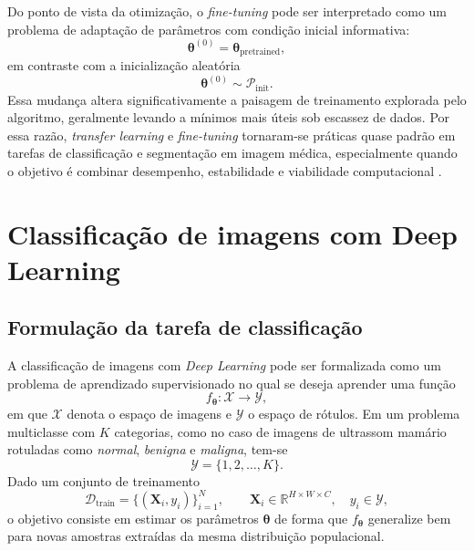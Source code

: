 \documentclass[tcc,capa]{texufpel}
\begin{document}
Do ponto de vista da otimização, o \textit{fine-tuning} pode ser interpretado como um problema de adaptação de parâmetros com condição inicial informativa:
\begin{equation}
\boldsymbol{\theta}^{(0)} = \boldsymbol{\theta}_{\text{pretrained}},
\end{equation}
em contraste com a inicialização aleatória
\begin{equation}
\boldsymbol{\theta}^{(0)} \sim \mathcal{P}_{\text{init}}.
\end{equation}
Essa mudança altera significativamente a paisagem de treinamento explorada pelo algoritmo, geralmente levando a mínimos mais úteis sob escassez de dados. Por essa razão, \textit{transfer learning} e \textit{fine-tuning} tornaram-se práticas quase padrão em tarefas de classificação e segmentação em imagem médica, especialmente quando o objetivo é combinar desempenho, estabilidade e viabilidade computacional \cite{Pan2010,Shin2016}.

\section{Classificação de imagens com Deep Learning}

\subsection{Formulação da tarefa de classificação}

A classificação de imagens com \textit{Deep Learning} pode ser formalizada como um problema de aprendizado supervisionado no qual se deseja aprender uma função
\begin{equation}
f_{\boldsymbol{\theta}} : \mathcal{X} \rightarrow \mathcal{Y},
\end{equation}
em que $\mathcal{X}$ denota o espaço de imagens e $\mathcal{Y}$ o espaço de rótulos. Em um problema multiclasse com $K$ categorias, como no caso de imagens de ultrassom mamário rotuladas como \textit{normal}, \textit{benigna} e \textit{maligna}, tem-se
\begin{equation}
\mathcal{Y} = \{1,2,\dots,K\}.
\end{equation}
Dado um conjunto de treinamento
\begin{equation}
\mathcal{D}_{\text{train}}=\{(\mathbf{X}_i,y_i)\}_{i=1}^{N},
\qquad
\mathbf{X}_i \in \mathbb{R}^{H \times W \times C}, \quad y_i \in \mathcal{Y},
\end{equation}
o objetivo consiste em estimar os parâmetros $\boldsymbol{\theta}$ de forma que $f_{\boldsymbol{\theta}}$ generalize bem para novas amostras extraídas da mesma distribuição populacional.
\end{document}

